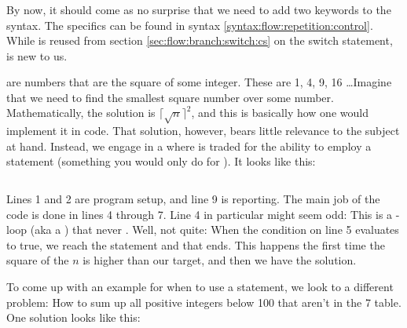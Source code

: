 \subsubsection{\csharp}

By now, it should come as no surprise that we need to add two keywords to the syntax. The specifics can be found in syntax \ref{syntax:flow:repetition:control}. While  is reused from section \ref{sec:flow:branch:switch:cs} on the switch statement,  is new to us.

\begin{syntaxfloat}
  
  \caption{Control structures for repetition}
  \label{syntax:flow:repetition:control}
\end{syntaxfloat}

 are numbers that are the square of some integer. These are 1, 4, 9, 16 \ldots Imagine that we need to find the smallest square number over some number. Mathematically, the solution is $\lceil \sqrt{n} \rceil ^2$, and this is basically how one would implement it in code. That solution, however, bears little relevance to the subject at hand. Instead, we engage in a  where  is traded for the ability to employ a  statement (something you would only do for ). It looks like this:

\inputminted[linenos]{csharp}{../src/csharp/flow_repetition/break/Program.cs}

Lines 1 and 2 are program setup, and line 9 is reporting. The main job of the code is done in lines 4 through 7. Line 4 in particular might seem odd: This is a - loop (aka a ) that never . Well, not quite: When the condition on line 5 evaluates to true, we reach the  statement and that  ends. This happens the first time the square of the $n$ is higher than our target, and then we have the solution.

To come up with an example for when to use a  statement, we look to a different problem: How to sum up all positive integers below 100 that aren't in the 7 table. One solution looks like this:

